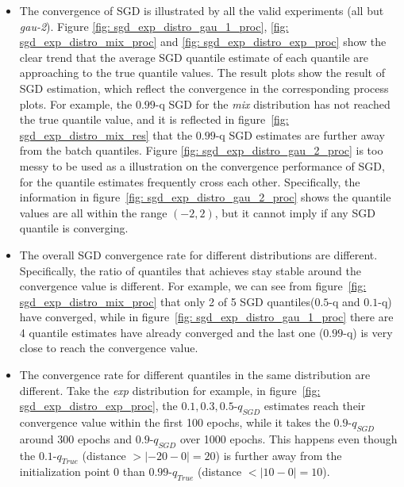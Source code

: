 \begin{itemize}
    \item  The convergence of SGD is illustrated by all the valid experiments (all but \textit{gau-2}). Figure \ref{fig: sgd_exp_distro_gau_1_proc}, \ref{fig: sgd_exp_distro_mix_proc} and \ref{fig: sgd_exp_distro_exp_proc} show the clear trend that the average SGD quantile estimate of each quantile are approaching to the true quantile values. 
    The result plots show the result of SGD estimation, which reflect the convergence in the corresponding process plots. For example, the $0.99$-q SGD for the \textit{mix} distribution has not reached the true quantile value, and it is reflected in figure~\ref{fig: sgd_exp_distro_mix_res} that the $0.99$-q SGD estimates are further away from the batch quantiles.
    Figure \ref{fig: sgd_exp_distro_gau_2_proc} is too messy to be used as a illustration on the convergence performance of SGD, for the quantile estimates frequently cross each other. Specifically, the information in figure~\ref{fig: sgd_exp_distro_gau_2_proc} shows the quantile values are all within the range $(-2, 2)$, but it cannot imply if any SGD quantile is converging.
    
    \item The overall SGD convergence rate for different distributions are different. Specifically, the ratio of quantiles that achieves stay stable around the convergence value is different. For example, we can see from figure~\ref{fig: sgd_exp_distro_mix_proc} that only 2 of 5 SGD quantiles($0.5$-q and $0.1$-q) have converged, while in figure~\ref{fig: sgd_exp_distro_gau_1_proc} there are 4 quantile estimates have already converged and the last one ($0.99$-q) is very close to reach the convergence value.
    
    \item The convergence rate for different quantiles in the same distribution are different. Take the \textit{exp} distribution for example, in figure~\ref{fig: sgd_exp_distro_exp_proc}, the $0.1, 0.3, 0.5$-$q_{SGD}$ estimates reach their convergence value within the first 100 epochs, while it takes the $0.9$-$q_{SGD}$ around 300 epochs and $0.9$-$q_{SGD}$ over 1000 epochs. This happens even though the $0.1$-$q_{True}$ (distance $> |-20-0| = 20$) is further away from the initialization point $0$ than $0.99$-$q_{True}$ (distance $< |10-0| = 10$).
    

\end{itemize}
